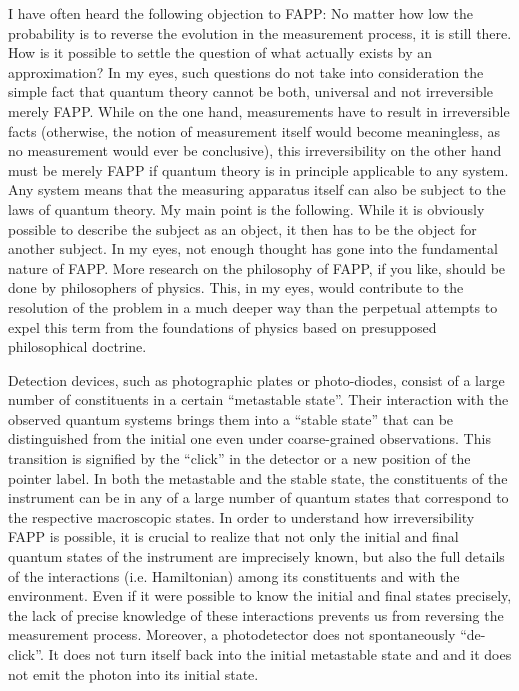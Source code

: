 \documentclass[12pt,a4]{article}
\begin{document}
I have often heard the following objection to FAPP: No matter how low the probability is to reverse the evolution in the measurement process, it is still there. How is it possible to settle the question of what actually exists by an approximation? In my eyes, such questions do not take into consideration the simple fact that quantum theory cannot be both, universal and not irreversible merely FAPP. While on the one hand, measurements have to result in irreversible facts (otherwise, the notion of measurement itself would become meaningless, as no measurement would ever be conclusive), this irreversibility on the other hand must be merely FAPP if quantum theory is in principle applicable to any system. Any system means that the measuring apparatus itself can also be subject to the laws of quantum theory. My main point is the following. While it is obviously possible to describe the subject as an object, it then has to be the object for another subject. In my eyes, not enough thought has gone into the fundamental nature of FAPP. More research on the philosophy of FAPP, if you like, should be done by philosophers of physics. This, in my eyes, would contribute to the resolution of the problem in a much deeper way than the perpetual attempts to expel this term from the foundations of physics based on presupposed philosophical doctrine. 

Detection devices, such as photographic plates or photo-diodes, consist of a large number of constituents in a certain ``metastable state''. Their interaction with the observed quantum systems brings them into a ``stable state'' that can be distinguished from the initial one even under coarse-grained observations. This transition is signified by the ``click'' in the detector or a new position of the pointer label. In both the metastable and the stable state, the constituents of the instrument can be in any of a large number of quantum states that correspond to the respective macroscopic states. In order to understand how irreversibility FAPP is possible, it is crucial to realize that not only the initial and final quantum states of the instrument are imprecisely known, but also the full details of the interactions (i.e. Hamiltonian) among its constituents and with the environment. Even if it were possible to know the initial and final states precisely, the lack of precise knowledge of these interactions prevents us from reversing the measurement process. Moreover, a photodetector does not spontaneously ``de-click''. It does not turn itself back into the initial metastable state and and it does not emit the photon into its initial state. 
\end{document}
